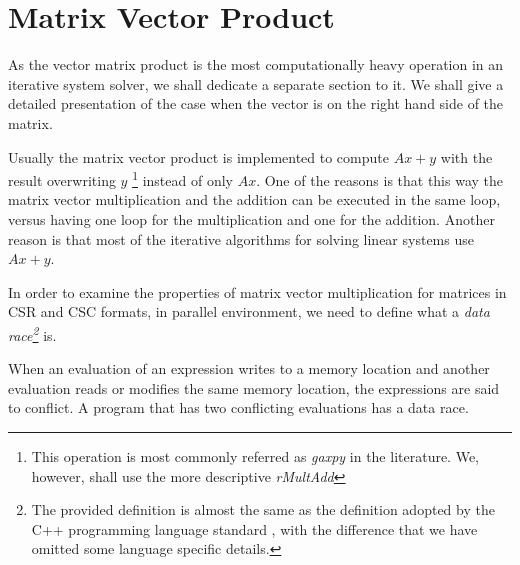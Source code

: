 \section{Matrix Vector Product}
As the vector matrix product is the most computationally heavy operation in an iterative system solver, we shall dedicate a separate section to it. We shall give a detailed presentation of the case when the vector is on the right hand side of the matrix.

Usually the matrix vector product is implemented to compute $Ax + y$ with the result overwriting $y$ \footnote{This operation is most commonly referred as \textit{gaxpy} in the literature. We, however, shall use the more descriptive \textit{rMultAdd}} instead of only $Ax$. One of the reasons is that this way the matrix vector multiplication and the addition can be executed in the same loop, versus having one loop for the multiplication and one for the addition. Another reason is that most of the iterative algorithms for solving linear systems use $Ax + y$.

In order to examine the properties of matrix vector multiplication for matrices in CSR and CSC formats, in parallel environment, we need to define what a \textit{data race\footnote{The provided definition is almost the same as the definition adopted by the C++ programming language standard \cite{ISO:2017:IIIa}, with the difference that we have omitted some language specific details.}} is.

\begin{definition}
When an evaluation of an expression writes to a memory location and another evaluation reads or modifies the same memory location, the expressions are said to conflict. A program that has two conflicting evaluations has a data race.
\end{definition}

